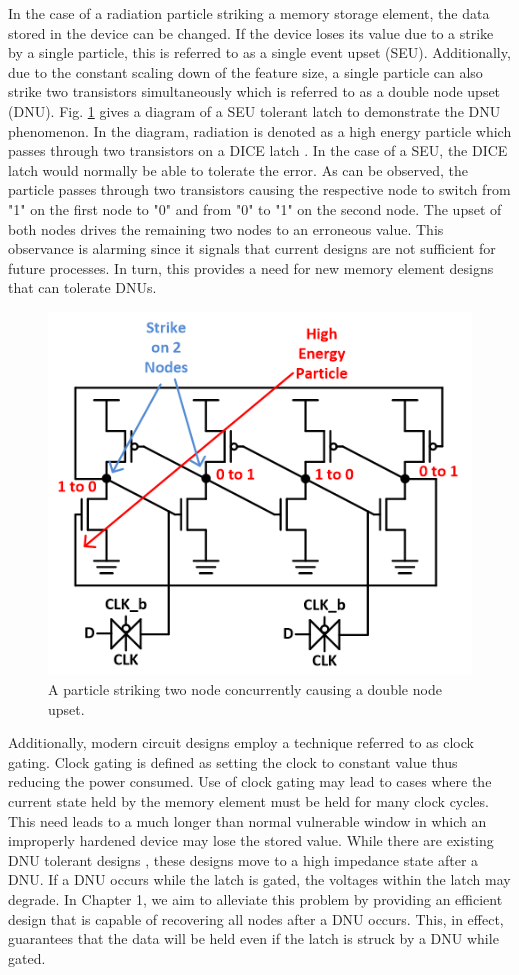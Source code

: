In the case of a radiation particle striking a memory storage element, the data stored in the device can be changed. If the device loses its value due to a strike by a single particle, this is referred to as a single event upset (SEU). Additionally, due to the constant scaling down of the feature size, a single particle can also strike two transistors simultaneously which is referred to as a double node upset (DNU). Fig. \ref{DNUStrike} gives a diagram of a SEU tolerant latch to demonstrate the DNU phenomenon. In the diagram, radiation is denoted as a high energy particle which passes through two transistors on a DICE latch \cite{DICE}. In the case of a SEU, the DICE latch would normally be able to tolerate the error. As can be observed, the particle passes through two transistors causing the respective node to switch from "1" on the first node to "0" and from "0" to "1" on the second node. The upset of both nodes drives the remaining two nodes to an erroneous value. This observance is alarming since it signals that current designs are not sufficient for future processes. In turn, this provides a need for new memory element designs that can tolerate DNUs. 

\begin{figure}[!htbp]
	\centering
	\includegraphics[width=0.45\linewidth]{Figures/StrikeonDICE}
	\caption{A particle striking two node concurrently causing a double node upset.}
	\label{DNUStrike}
\end{figure} 

Additionally, modern circuit designs employ a technique referred to as clock gating. Clock gating is defined as setting the clock to constant value thus reducing the power consumed. Use of clock gating may lead to cases where the current state held by the memory element must be held for many clock cycles. This need leads to a much longer than normal vulnerable window in which an improperly hardened device may lose the stored value. While there are existing DNU tolerant designs \cite{Inter,DNCS,HSMUF}, these designs move to a high impedance state after a DNU. If a DNU occurs while the latch is gated, the voltages within the latch may degrade. In Chapter 1, we aim to alleviate this problem by providing an efficient design that is capable of recovering all nodes after a DNU occurs. This, in effect, guarantees that the data will be held even if the latch is struck by a DNU while gated.


